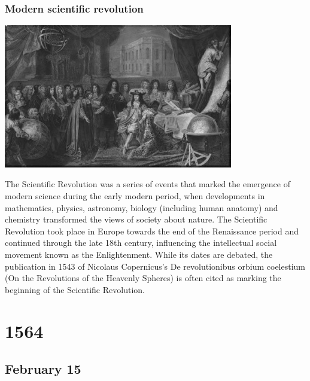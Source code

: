 \documentclass[11pt]{report}
\begin{document}
\subsection{Modern scientific revolution}
\vspace{2mm}\begin{center}\includegraphics[width=10cm]{./img/screvolution.jpg}\end{center}
The Scientific Revolution was a series of events that marked the emergence of modern science during the early modern period, when developments in mathematics, physics, astronomy, biology (including human anatomy) and chemistry transformed the views of society about nature. The Scientific Revolution took place in Europe towards the end of the Renaissance period and continued through the late 18th century, influencing the intellectual social movement known as the Enlightenment. While its dates are debated, the publication in 1543 of Nicolaus Copernicus's De revolutionibus orbium coelestium (On the Revolutions of the Heavenly Spheres) is often cited as marking the beginning of the Scientific Revolution.

\chapter{1564}
\section{February 15}
\end{document}
